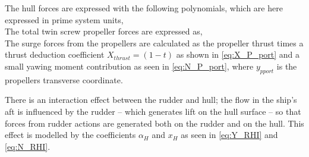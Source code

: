 The hull forces are expressed with the following polynomials, which are here expressed in prime system units,
\begin{equation}
    \label{eq:X_H}
    
\end{equation}
%
\begin{equation}
    \label{eq:Y_H}
    
\end{equation}
%
\begin{equation}
    \label{eq:N_H}
    
\end{equation}
The total twin screw propeller forces are expressed as,
\begin{equation}
    \label{eq:X_P}
    
\end{equation}
%
\begin{equation}
    \label{eq:Y_P}
    
\end{equation}
%
\begin{equation}
    \label{eq:N_P}
    
\end{equation}
The surge forces from the propellers are calculated as the propeller thrust times a thrust deduction coefficient $X_{thrust}=(1-t)$ as shown in \autoref{eq:X_P_port} and a small yawing moment contribution as seen in \autoref{eq:N_P_port}, where $y_{pport}$ is the propellers transverse coordinate.
\begin{equation}
    \label{eq:X_P_port}
    
\end{equation}
\begin{equation}
    \label{eq:N_P_port}
    
\end{equation}

There is an interaction effect between the rudder and hull; the flow in the ship's aft is influenced by the rudder -- which generates lift on the hull surface -- so that forces from rudder actions are generated both on the rudder and on the hull. This effect is modelled by the coefficients $\alpha_H$ and $x_H$ as seen in \autoref{eq:Y_RHI} and \autoref{eq:N_RHI}.
\begin{equation}
    \label{eq:Y_RHI}
    
\end{equation}
%
\begin{equation}
    \label{eq:N_RHI}
    
\end{equation}


